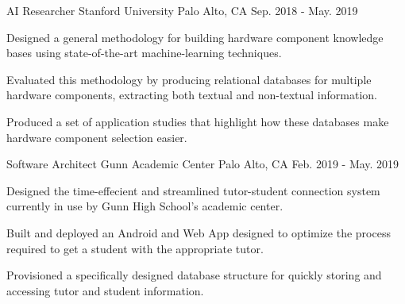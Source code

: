 

\begin{cventries}

  \cventry
    {AI Researcher} %
    {Stanford University} %
    {Palo Alto, CA} %
    {Sep. 2018 - May. 2019} %
    {
      \begin{cvitems} %
        \item {Designed a general methodology for building hardware component knowledge
		bases using state-of-the-art machine-learning techniques.}
	\item {Evaluated this methodology by producing relational databases
		for multiple hardware components, extracting both textual and non-textual
		information.}
	\item {Produced a set of application studies that highlight how
		these databases make hardware component selection easier.}
      \end{cvitems}
    }

  \cventry
    {Software Architect} %
    {Gunn Academic Center} %
    {Palo Alto, CA} %
    {Feb. 2019 - May. 2019} %
    {
      \begin{cvitems} %
        \item {Designed the time-effecient and streamlined tutor-student
		connection system currently in use by Gunn High School's
		academic center.}
        \item {Built and deployed an Android and Web App designed to optimize
		the process required to get a student with the appropriate
		tutor.}
        \item {Provisioned a specifically designed database structure for
		quickly storing and accessing tutor and student information.}
      \end{cvitems}
    }

\end{cventries}
